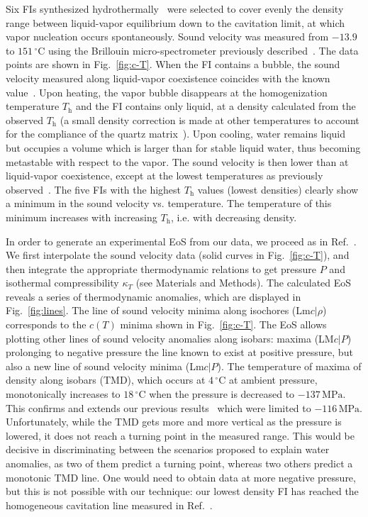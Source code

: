 \documentclass[12pt]{article}
\newcommand{\mrm}{\mathrm}
\newcommand{\unit}{\,\mrm}
\newcommand{\degreeC}{\,^\circ\mathrm{C}}
\newcommand{\Th}{T_\mrm{h}}
\begin{document}
Six FIs synthesized hydrothermally~\cite{Qiu_exploration_2016} were selected to cover evenly the density range between liquid-vapor equilibrium down to the cavitation limit, at which vapor nucleation occurs spontaneously. Sound velocity was measured from $-13.9$ to $151\degreeC$ using the Brillouin micro-spectrometer previously described~\cite{Pallares_anomalies_2014}. The data points are shown in Fig.~\ref{fig:c-T}. When the FI contains a bubble, the sound velocity measured along liquid-vapor coexistence coincides with the known value~\cite{Wagner_IAPWS_2002}. Upon heating, the vapor bubble disappears at the homogenization temperature $\Th$ and the FI contains only liquid, at a density calculated from the observed $\Th$ (a small density correction is made at other temperatures to account for the compliance of the quartz matrix~\cite{Pallares_equation_2016}). Upon cooling, water remains liquid but occupies a volume which is larger than for stable liquid water, thus becoming metastable with respect to the vapor. The sound velocity is then lower than at liquid-vapor coexistence, except at the lowest temperatures as previously observed~\cite{Pallares_anomalies_2014}. The five FIs with the highest $\Th$ values (lowest densities) clearly show a minimum in the sound velocity vs. temperature. The temperature of this minimum increases with increasing $\Th$, i.e. with decreasing density. 

In order to generate an experimental EoS from our data, we proceed as in Ref.~\cite{Pallares_equation_2016}. We first interpolate the sound velocity data (solid curves in Fig.~\ref{fig:c-T}), and then integrate the appropriate thermodynamic relations to get pressure $P$ and isothermal compressibility $\kappa_T$ (see Materials and Methods). The calculated EoS reveals a series of thermodynamic anomalies, which are displayed in Fig.~\ref{fig:lines}. The line of sound velocity minima along isochores (Lm$c|\rho$) corresponds to the $c(T)$ minima shown in Fig.~\ref{fig:c-T}. The EoS allows plotting other lines of sound velocity anomalies along isobars: maxima (LM$c|P$) prolonging to negative pressure the line known to exist at positive pressure, but also a new line of sound velocity minima (Lm$c|P$). The temperature of maxima of density along isobars (TMD), which occurs at $4\degreeC$ at ambient pressure, monotonically increases to $18\degreeC$ when the pressure is decreased to $-137\unit{MPa}$. This confirms and extends our previous results~\cite{Pallares_equation_2016} which were limited to $-116\unit{MPa}$. Unfortunately, while the TMD gets more and more vertical as the pressure is lowered, it does not reach a turning point in the measured range. This would be decisive in discriminating between the scenarios proposed to explain water anomalies, as two of them predict a turning point\cite{Poole_phase_1992,Sastry_singularityfree_1996}, whereas two others predict a monotonic TMD line\cite{Speedy_stabilitylimit_1982,Poole_effect_1994,Angell_insights_2008}. One would need to obtain data at more negative pressure, but this is not possible with our technique: our lowest density FI has reached the homogeneous cavitation line measured in Ref.~\cite{Qiu_exploration_2016}.
\end{document}
